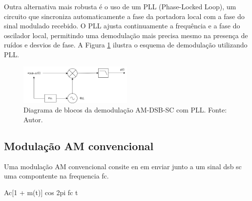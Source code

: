 Outra alternativa mais robusta é o uso de um PLL (Phase-Locked Loop), um circuito que sincroniza automaticamente a fase da portadora local com a fase do sinal modulado recebido. O PLL ajusta continuamente a frequência e a fase do oscilador local, permitindo uma demodulação mais precisa mesmo na presença de ruídos e desvios de fase. A Figura \ref{fig:demodulacao_am_pll} ilustra o esquema de demodulação utilizando PLL.

\begin{figure}[h]
    \centering
    \includegraphics[width=0.5\textwidth]{images/demodulacao_am_pll.png}
    \caption{Diagrama de blocos da demodulação AM-DSB-SC com PLL. Fonte: Autor.}
    \label{fig:demodulacao_am_pll}
    \centering
\end{figure}

\subsection{Modulação AM convencional}

Uma modulação AM convencional consite en em enviar junto a um sinal dsb sc uma compontente na frequencia fc.


Ac[1 + m(t)] cos 2pi fc t



